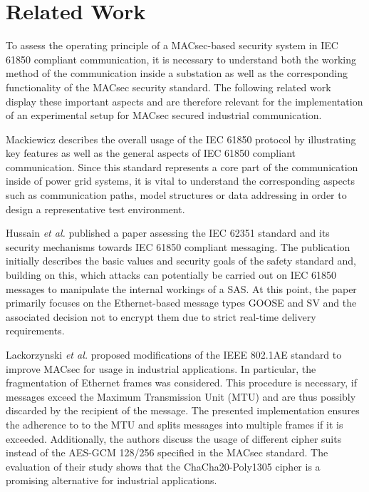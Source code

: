 \documentclass[conference, onecolumn, a4paper]{IEEEtran}
\begin{document}
\section{Related Work}
\label{chapter:relatedWork}
\noindent To assess the operating principle of a MACsec-based security system in IEC 61850 compliant communication, it is necessary to understand both 
the working method of the communication inside a substation as well as the corresponding functionality of the MACsec security standard. The following 
related work display these important aspects and are therefore relevant for the implementation of an experimental setup for MACsec secured industrial 
communication.

\smallskip
Mackiewicz \cite{IEC61850_Overview:2006} describes the overall usage of the IEC 61850 protocol by illustrating key features as well as the general aspects 
of IEC 61850 compliant communication. Since this standard represents a core part of the communication inside of power grid systems, it is vital to 
understand the corresponding aspects such as communication paths, model structures or data addressing in order to design a representative test environment. 

\smallskip
Hussain  \textit{et al.} \cite{Review_IEC62351:2019} published a paper assessing the IEC 62351 standard and its security mechanisms towards IEC 61850 
compliant messaging. The publication initially describes the basic values and security goals of the safety standard and, building on this, which attacks 
can potentially be carried out on IEC 61850 messages to manipulate the internal workings of a SAS. At this point, the paper primarily focuses on the 
Ethernet-based message types GOOSE and SV and the associated decision not to encrypt them due to strict real-time delivery requirements.  

\smallskip
Lackorzynski \textit{et al.} \cite{MACsecIndustrialOptimization:2020} proposed modifications of the IEEE 802.1AE standard to improve MACsec for usage 
in industrial applications. In particular, the fragmentation of Ethernet frames was considered. This procedure is necessary, if messages exceed the 
Maximum Transmission Unit (MTU) and are thus possibly discarded by the recipient of the message. The presented implementation ensures the adherence to 
to the MTU and splits messages into multiple frames if it is exceeded. Additionally, the authors discuss the usage of different cipher suits instead of 
the AES-GCM 128/256 specified in the MACsec standard. The evaluation of their study shows that the ChaCha20-Poly1305 cipher is a promising alternative 
for industrial applications.
\end{document}

